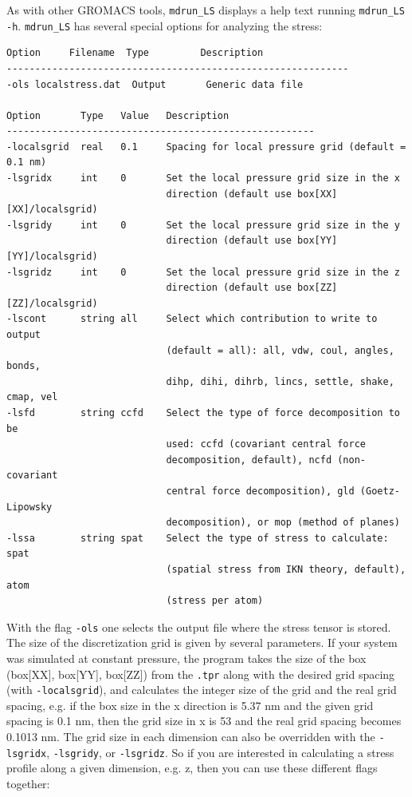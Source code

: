 \documentclass[10pt,letterpaper,notitlepage]{article}
\begin{document}
As with other GROMACS tools, \texttt{mdrun\_LS} displays a help text running \texttt{mdrun\_LS -h}. \texttt{mdrun\_LS} has several special options for analyzing the stress:
\begin{lstlisting}[caption=\texttt{mdrun\_LS} special options]
Option     Filename  Type         Description
------------------------------------------------------------
-ols localstress.dat  Output       Generic data file

Option       Type   Value   Description
------------------------------------------------------
-localsgrid  real   0.1     Spacing for local pressure grid (default = 0.1 nm)
-lsgridx     int    0       Set the local pressure grid size in the x
                            direction (default use box[XX][XX]/localsgrid)
-lsgridy     int    0       Set the local pressure grid size in the y
                            direction (default use box[YY][YY]/localsgrid)
-lsgridz     int    0       Set the local pressure grid size in the z
                            direction (default use box[ZZ][ZZ]/localsgrid)
-lscont      string all     Select which contribution to write to output
                            (default = all): all, vdw, coul, angles, bonds,
                            dihp, dihi, dihrb, lincs, settle, shake, cmap, vel
-lsfd        string ccfd    Select the type of force decomposition to be
                            used: ccfd (covariant central force
                            decomposition, default), ncfd (non-covariant
                            central force decomposition), gld (Goetz-Lipowsky
                            decomposition), or mop (method of planes)
-lssa        string spat    Select the type of stress to calculate: spat
                            (spatial stress from IKN theory, default), atom
                            (stress per atom)

\end{lstlisting}
With the flag \texttt{-ols} one selects the output file where the stress tensor is stored. The size of the discretization grid is given by several parameters. If your system was simulated at constant pressure, the program takes the size of the box (box[XX], box[YY], box[ZZ]) from the \texttt{.tpr} along with the desired grid spacing (with \texttt{-localsgrid}), and calculates the integer size of the grid and the real grid spacing, e.g. if the box size in the x direction is 5.37 nm and the given grid spacing is 0.1 nm, then the grid size in x is 53 and the real grid spacing becomes 0.1013 nm. The grid size in each dimension can also be overridden with the \texttt{-lsgridx}, \texttt{-lsgridy}, or \texttt{-lsgridz}. So if you are interested in calculating a stress profile along a given dimension, e.g. z, then you can use these different flags together:
\end{document}
